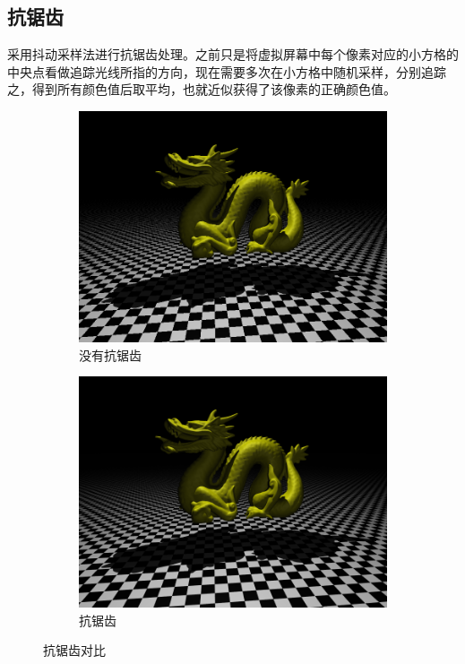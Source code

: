 \subsection {抗锯齿}
采用抖动采样法进行抗锯齿处理。之前只是将虚拟屏幕中每个像素对应的小方格的中央点看做追踪光线所指的方向，现在需要多次在小方格中随机采样，分别追踪之，得到所有颜色值后取平均，也就近似获得了该像素的正确颜色值。
\begin{figure}
    \centering
    \begin{subfigure}{\textwidth}
        \includegraphics[width=\textwidth]{./img/without_anti.png}
        \caption{没有抗锯齿}
    \end{subfigure}
    \begin{subfigure}{\textwidth}
        \includegraphics[width=\textwidth]{./img/anti.png}
        \caption{抗锯齿}
    \end{subfigure}
    \caption{抗锯齿对比}
    \label{fig:anti}
\end{figure}

